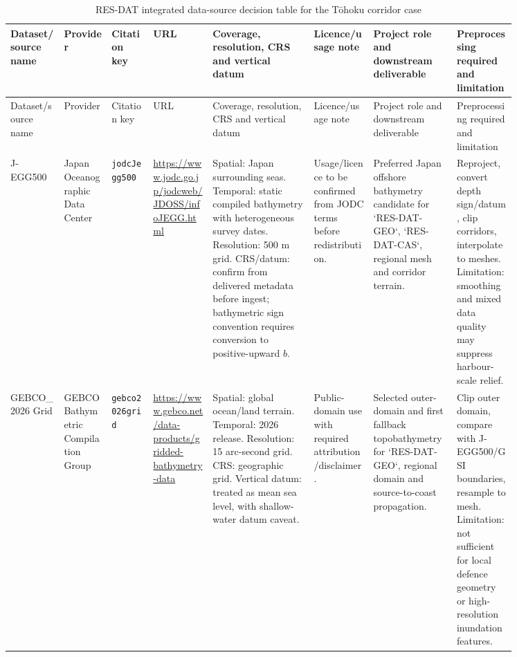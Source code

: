 \begin{landscape}
\scriptsize
\setlength{\tabcolsep}{3pt}
\begin{longtable}{
    p{0.09\linewidth}
    p{0.08\linewidth}
    p{0.07\linewidth}
    p{0.10\linewidth}
    p{0.17\linewidth}
    p{0.10\linewidth}
    p{0.14\linewidth}
    p{0.10\linewidth}
  }
  \caption{RES-DAT integrated data-source decision table for the Tōhoku corridor case}
  \label{tab:res-dat-cas-data-source-decision-table}
  \\
  \hline
  Dataset/source name
  &
  Provider
  &
  Citation key
  &
  URL
  &
  Coverage, resolution, CRS and vertical datum
  &
  Licence/usage note
  &
  Project role and downstream deliverable
  &
  Preprocessing required and limitation
  \\
  \hline
  \endfirsthead
  \hline
  Dataset/source name
  &
  Provider
  &
  Citation key
  &
  URL
  &
  Coverage, resolution, CRS and vertical datum
  &
  Licence/usage note
  &
  Project role and downstream deliverable
  &
  Preprocessing required and limitation
  \\
  \hline
  \endhead
  J-EGG500
  &
  Japan Oceanographic Data Center
  &
  \texttt{jodcJegg500}
  &
  \url{https://www.jodc.go.jp/jodcweb/JDOSS/infoJEGG.html}
  &
  Spatial: Japan surrounding seas. Temporal: static compiled bathymetry with heterogeneous survey dates. Resolution: 500 m grid. CRS/datum: confirm from delivered metadata before ingest; bathymetric sign convention requires conversion to positive-upward $b$.
  &
  Usage/licence to be confirmed from JODC terms before redistribution.
  &
  Preferred Japan offshore bathymetry candidate for `RES-DAT-GEO`, `RES-DAT-CAS`, regional mesh and corridor terrain.
  &
  Reproject, convert depth sign/datum, clip corridors, interpolate to meshes. Limitation: smoothing and mixed data quality may suppress harbour-scale relief.
  \\
  GEBCO\_2026 Grid
  &
  GEBCO Bathymetric Compilation Group
  &
  \texttt{gebco2026grid}
  &
  \url{https://www.gebco.net/data-products/gridded-bathymetry-data}
  &
  Spatial: global ocean/land terrain. Temporal: 2026 release. Resolution: 15 arc-second grid. CRS: geographic grid. Vertical datum: treated as mean sea level, with shallow-water datum caveat.
  &
  Public-domain use with required attribution/disclaimer.
  &
  Selected outer-domain and first fallback topobathymetry for `RES-DAT-GEO`, regional domain and source-to-coast propagation.
  &
  Clip outer domain, compare with J-EGG500/GSI boundaries, resample to mesh. Limitation: not sufficient for local defence geometry or high-resolution inundation features.

\end{longtable}
\end{landscape}
